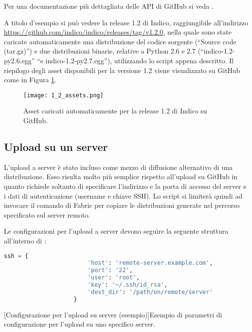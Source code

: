             Per una documentazione più dettagliata delle \ac{API} di GitHub si veda \cite{github:api}.
            
            A titolo d'esempio si può vedere la release 1.2 di Indico, raggiungibile all'indirizzo \url{https://github.com/indico/indico/releases/tag/v1.2.0}, nella quale sono state caricate automaticamente una distribuzione del codice sorgente (``Source code (tar.gz)'') e due distribuzioni binarie, relative a Python 2.6 e 2.7 (``indico-1.2-py2.6.egg'' ``e indico-1.2-py2.7.egg''), utilizzando lo script appena descritto. Il riepilogo degli asset disponibili per la versione 1.2 viene visualizzato su GitHub come in Figura \ref{fig:1_2_asset}.
            
        	\begin{figure}[h!]
        		\begin{center}
        			\texttt{[image: 1\_2\_assets.png]}
        		\end{center}
        		\caption[Asset della release 1.2]{Asset caricati automaticamente per la release 1.2 di Indico su GitHub.}
        		\label{fig:1_2_asset}
        	\end{figure}
        
        \subsection{Upload su un server} \label{subsec:dp;ud;upload_server}
        
            L'upload a server è stato incluso come mezzo di diffusione alternativo di una distribuzione. Esso risulta molto più semplice rispetto all'upload su GitHub in quanto richiede soltanto di specificare l'indirizzo e la porta di accesso del server e i dati di autenticazione (username e chiave \ac{SSH}). Lo script si limiterà quindi ad invocare il comando  di Fabric per copiare le distribuzioni generate nel percorso specificato sul server remoto.
            
            Le configurazioni per l'upload a server devono seguire la seguente struttura all'interno di :
            
            \begin{center}
                \begin{lstlisting}[language=python, gobble=18]
                    ssh = {
                        'host': 'remote-server.example.com',
                        'port': '22',
                        'user': 'root',
                        'key': '~/.ssh/id_rsa',
                        'dest_dir': '/path/on/remote/server'
                    }
                \end{lstlisting}
                \captionsetup{textformat=empty,labelformat=empty} \vspace{-2em}
                [Configurazione per l'upload su server (esempio)]{Esempio di parametri di configurazione per l'upload su uno specifico server.}
            \end{center}
